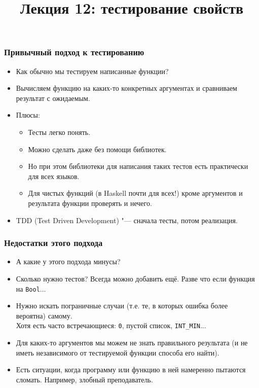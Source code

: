 \documentclass[11pt]{beamer}
\title{Лекция 12: тестирование свойств}
\begin{document}
    \begin{frame}[plain]
    \maketitle
\end{frame}

\begin{frame}[fragile]
\frametitle{Привычный подход к тестированию}
\begin{itemize}
    \item Как обычно мы тестируем написанные функции?
    \pause
    \item Вычисляем функцию на каких-то конкретных аргументах и сравниваем результат с ожидаемым.
    \item Плюсы:
    \pause
    \begin{itemize}
        \item Тесты легко понять.
        \item Можно сделать даже без помощи библиотек.
        \item Но при этом библиотеки для написания таких тестов есть практически для всех языков.
        \item Для чистых функций (в Haskell почти для всех!) кроме аргументов и результата функции проверять и нечего.
    \end{itemize}
    \pause
    \item TDD (Test Driven Development) \pause "--- сначала тесты, потом реализация.
\end{itemize}
\end{frame}

\begin{frame}[fragile]
\frametitle{Недостатки этого подхода}
\begin{itemize}
    \item А какие у этого подхода минусы?
    \pause
    \item Сколько нужно тестов? Всегда можно добавить ещё.
    \pause
    Разве что если функция на \lstinline|Bool|...
    \pause
    \item Нужно искать пограничные случаи (т.е. те, в которых ошибка более вероятна) самому. \\
    Хотя есть часто встречающиеся: \pause \lstinline|0|, пустой список, \lstinline|INT_MIN|...
    \pause
    \item Для каких-то аргументов мы можем не знать правильного результата (и не иметь независимого от тестируемой функции способа его найти).
    \pause
    \item Есть ситуации, когда программу или функцию в ней намеренно пытаются сломать. \pause Например, злобный преподаватель.
\end{itemize}
\end{frame}
\end{document}
